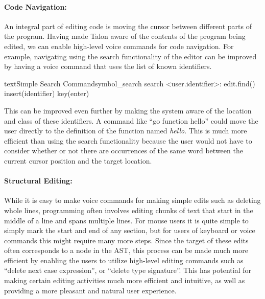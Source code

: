 \documentclass[../thesis.tex]{subfiles}
\begin{document}
\paragraph{Code Navigation:}%
\label{code_navigation}
An integral part of editing code is moving the cursor between different parts of the program.
Having made Talon aware of the contents of the program being edited, we can enable
high-level voice commands for code navigation.
For example, navigating using the search functionality of the editor can be improved
by having a voice command that uses the list of known identifiers.
\begin{code}{text}{Simple Search Command}{symbol_search}
search <user.identifier>: 
    edit.find()
    insert(identifier)
    key(enter)
\end{code}
This can be improved even further by making the system aware of the
location and class of these identifiers.
A command like ``go function hello'' could move the user directly to the definition of the function named \textit{hello}.
This is much more efficient than using the search functionality because the user would not have to
consider whether or not there are occurrences of the same word between the current cursor position
and the target location.

\paragraph{Structural Editing:}%
\label{structural_editing}
While it is easy to make voice commands for making simple edits such as deleting whole lines,
programming often involves editing chunks of text that start in the middle of a line
and spans multiple lines. 
For mouse users it is quite simple to simply mark the start and end of any section, but for 
users of keyboard or voice commands this might require many more steps.
Since the target of these edits often corresponds to a node in the AST, this process
can be made much more efficient by enabling the users to utilize high-level editing commands
such as ``delete next case expression'', or ``delete type signature''.
This has potential for making certain editing activities much more efficient and intuitive,
as well as providing a more pleasant and natural user experience.
\end{document}
